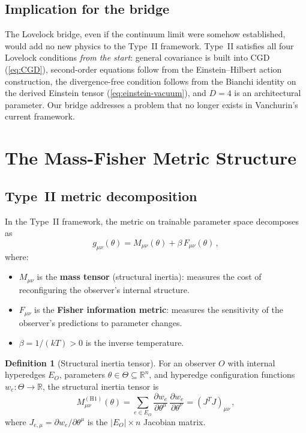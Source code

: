 \documentclass[11pt]{article}
\theoremstyle{definition}
\newtheorem{definition}[theorem]{Definition}
\theoremstyle{remark}
\begin{document}
\subsection{Implication for the bridge}
\label{sec:bridge-implication}

The Lovelock bridge, even if the continuum limit were somehow established,
would add no new physics to the Type~II framework.
Type~II satisfies all four Lovelock conditions \emph{from the start}:
general covariance is built into CGD (\cref{eq:CGD}),
second-order equations follow from the Einstein--Hilbert action
construction, the divergence-free condition follows from the Bianchi
identity on the derived Einstein tensor (\cref{eq:einstein-vacuum}), and
$D = 4$ is an architectural parameter.
Our bridge addresses a problem that no longer exists in Vanchurin's
current framework.

\section{The Mass-Fisher Metric Structure}
\label{sec:mass-fisher}

\subsection{Type~II metric decomposition}
\label{sec:metric-decomposition}

In the Type~II framework, the metric on trainable parameter space
decomposes as
\begin{equation}
\label{eq:metric-decomposition}
g_{\mu\nu}(\theta) = M_{\mu\nu}(\theta) + \beta\, F_{\mu\nu}(\theta)\,,
\end{equation}
where:
\begin{itemize}
\item $M_{\mu\nu}$ is the \textbf{mass tensor} (structural inertia):
  measures the cost of reconfiguring the observer's internal structure.
\item $F_{\mu\nu}$ is the \textbf{Fisher information metric}: measures
  the sensitivity of the observer's predictions to parameter changes.
\item $\beta = 1/(kT) > 0$ is the inverse temperature.
\end{itemize}

\begin{definition}[Structural inertia tensor]
\label{def:H1}
For an observer $O$ with internal hyperedges $E_O$, parameters
$\theta \in \Theta \subseteq \mathbb{R}^n$, and hyperedge configuration
functions $w_e : \Theta \to \mathbb{R}$, the structural inertia
tensor is
\begin{equation}
\label{eq:H1}
M^{(\mathrm{H1})}_{\mu\nu}(\theta) = \sum_{e \in E_O}
\frac{\partial w_e}{\partial \theta^\mu}\,
\frac{\partial w_e}{\partial \theta^\nu}
= (J^T J)_{\mu\nu}\,,
\end{equation}
where $J_{e,\mu} = \partial w_e / \partial \theta^\mu$ is the
$|E_O| \times n$ Jacobian matrix.
\end{definition}
\end{document}
